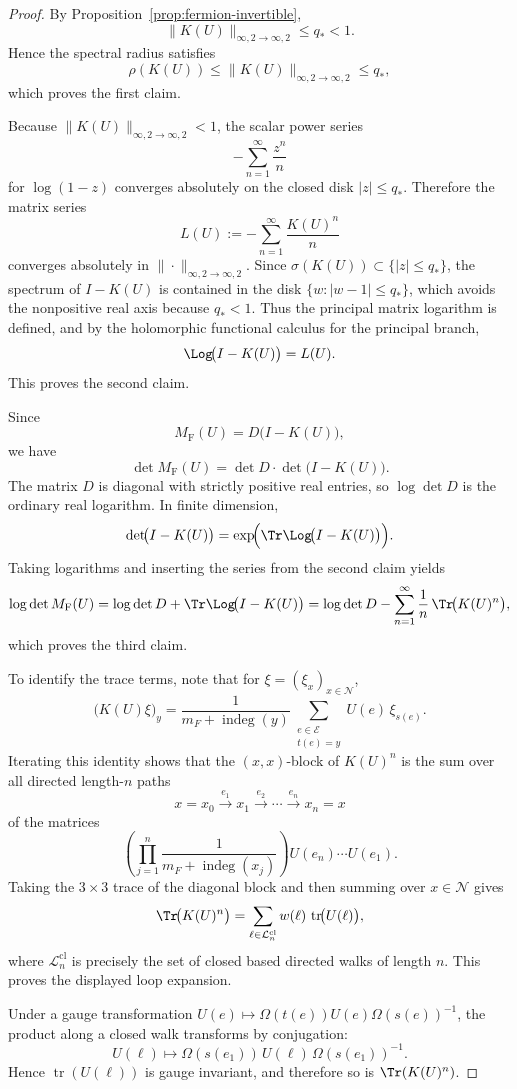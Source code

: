 \documentclass[11pt]{article}
\theoremstyle{remark}
\newcommand{\mcN}{\mathcal N}
\newcommand{\mcE}{\mathcal E}
\newcommand{\tr}{\operatorname{tr}}
\newcommand{\indeg}{\operatorname{indeg}}
\begin{document}
\begin{proof}
By Proposition~\ref{prop:fermion-invertible},
\[
\|K(U)\|_{\infty,2\to\infty,2}
\le q_*<1.
\]
Hence the spectral radius satisfies
\[
\rho(K(U))\le \|K(U)\|_{\infty,2\to\infty,2}\le q_*,
\]
which proves the first claim.

Because \(\|K(U)\|_{\infty,2\to\infty,2}<1\), the scalar power series
\[
-\sum_{n=1}^\infty \frac{z^n}{n}
\]
for \(\log(1-z)\) converges absolutely on the closed disk
\(|z|\le q_*\).  Therefore the matrix series
\[
L(U):=-\sum_{n=1}^\infty \frac{K(U)^n}{n}
\]
converges absolutely in \(\|\cdot\|_{\infty,2\to\infty,2}\).  Since
\(\sigma(K(U))\subset\{|z|\le q_*\}\), the spectrum of \(I-K(U)\) is contained
in the disk \(\{w:|w-1|\le q_*\}\), which avoids the nonpositive real axis
because \(q_*<1\).  Thus the principal matrix logarithm is defined, and by the
holomorphic functional calculus for the principal branch,
\[
\Log\!\bigl(I-K(U)\bigr)=L(U).
\]
This proves the second claim.

Since
\[
M_{\mathrm F}(U)=D\bigl(I-K(U)\bigr),
\]
we have
\[
\det M_{\mathrm F}(U)=\det D\cdot \det\!\bigl(I-K(U)\bigr).
\]
The matrix \(D\) is diagonal with strictly positive real entries, so
\(\log\det D\) is the ordinary real logarithm.  In finite dimension,
\[
\det\!\bigl(I-K(U)\bigr)
=
\exp\!\Bigl(\Tr \Log\!\bigl(I-K(U)\bigr)\Bigr).
\]
Taking logarithms and inserting the series from the second claim yields
\[
\log\det M_{\mathrm F}(U)
=
\log\det D+\Tr \Log\!\bigl(I-K(U)\bigr)
=
\log\det D-\sum_{n=1}^\infty \frac1n\,\Tr\!\bigl(K(U)^n\bigr),
\]
which proves the third claim.

To identify the trace terms, note that for \(\xi=(\xi_x)_{x\in\mcN}\),
\[
\bigl(K(U)\xi\bigr)_y
=
\frac{1}{m_F+\indeg(y)}
\sum_{\substack{e\in\mcE\\ t(e)=y}}U(e)\,\xi_{s(e)}.
\]
Iterating this identity shows that the \((x,x)\)-block of \(K(U)^n\) is the
sum over all directed length-\(n\) paths
\[
x=x_0\xrightarrow{e_1}x_1\xrightarrow{e_2}\cdots\xrightarrow{e_n}x_n=x
\]
of the matrices
\[
\left(\prod_{j=1}^n \frac{1}{m_F+\indeg(x_j)}\right)
U(e_n)\cdots U(e_1).
\]
Taking the \(3\times3\) trace of the diagonal block and then summing over
\(x\in\mcN\) gives
\[
\Tr\!\bigl(K(U)^n\bigr)
=
\sum_{\ell\in\mathcal L_n^{\mathrm{cl}}}
w(\ell)\,\tr\!\bigl(U(\ell)\bigr),
\]
where \(\mathcal L_n^{\mathrm{cl}}\) is precisely the set of closed based
directed walks of length \(n\).  This proves the displayed loop expansion.

Under a gauge transformation \(U(e)\mapsto \Omega(t(e))U(e)\Omega(s(e))^{-1}\),
the product along a closed walk transforms by conjugation:
\[
U(\ell)\mapsto \Omega(s(e_1))\,U(\ell)\,\Omega(s(e_1))^{-1}.
\]
Hence \(\tr(U(\ell))\) is gauge invariant, and therefore so is
\(\Tr(K(U)^n)\).


\end{proof}
\end{document}
